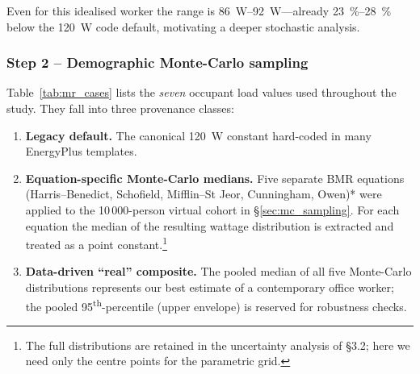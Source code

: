 Even for this idealised worker the range is
\SIrange[round-precision=0]{86}{92}{\watt}---already \SIrange[round-precision=0]{23}{28}{\percent} below the \SI{120}{\watt} code default, motivating a deeper stochastic analysis.

\subsubsection{Step 2 – Demographic Monte-Carlo sampling}
\label{sec:mr_catalogue}

Table~\ref{tab:mr_cases} lists the \emph{seven} occupant load values used
throughout the study.  They fall into three provenance classes:

\begin{enumerate}
\item \textbf{Legacy default.}  The canonical \SI{120}{W} constant hard-coded
      in many EnergyPlus templates.
\item \textbf{Equation-specific Monte-Carlo medians.}  
      Five separate BMR equations
      (Harris–Benedict, Schofield, Mifflin–St Jeor, Cunningham,
      Owen)* were applied to the 10\,000-person virtual cohort
      in §\ref{sec:mc_sampling}.  
      For each equation the median of the resulting wattage distribution
      is extracted and treated as a point constant.\footnote{The full
      distributions are retained in the uncertainty analysis of
      §3.2; here we need only the centre points for the parametric
      grid.}
\item \textbf{Data-driven “real” composite.}  
      The pooled median of all five Monte-Carlo distributions represents
      our best estimate of a contemporary office worker; the pooled
      95\textsuperscript{th}-percentile (upper envelope) is reserved for
      robustness checks.
\end{enumerate}

